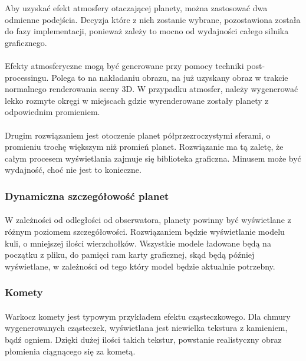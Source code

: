 Aby uzyskać efekt atmosfery otaczającej planety, można zastosować dwa odmienne podejścia. Decyzja które z nich zostanie wybrane, pozostawiona została do fazy implementacji, ponieważ zależy to mocno od wydajności całego silnika graficznego.

\paragraph{}

Efekty atmosferyczne mogą być generowane przy pomocy techniki post-processingu. Polega to na nakładaniu obrazu, na już uzyskany obraz w trakcie normalnego renderowania sceny 3D. W przypadku atmosfer, należy wygenerować lekko rozmyte okręgi w miejscach gdzie wyrenderowane zostały planety z odpowiednim promieniem.

\paragraph{}

Drugim rozwiązaniem jest otoczenie planet półprzezroczystymi sferami, o promieniu trochę większym niż promień planet. Rozwiązanie ma tą zaletę, że całym procesem wyświetlania zajmuje się biblioteka graficzna. Minusem może być wydajność, choć nie jest to konieczne.


\subsubsection{Dynamiczna szczegółowość planet}\label{subsub:dynamiczna szczegolowosc planet}

\paragraph{}

W zależności od odległości od obserwatora, planety powinny być wyświetlane z różnym poziomem szczegółowości. Rozwiązaniem będzie wyświetlanie modelu kuli, o mniejszej ilości wierzchołków. Wszystkie modele ładowane będą na początku z pliku, do pamięci ram karty graficznej, skąd będą później wyświetlane, w zależności od tego który model będzie aktualnie potrzebny.

\subsubsection{Komety}\label{subsub:komety}

\paragraph{}

Warkocz komety jest typowym przykładem efektu cząsteczkowego. Dla chmury wygenerowanych cząsteczek, wyświetlana jest niewielka tekstura z kamieniem, bądź ogniem. Dzięki dużej ilości takich tekstur, powstanie realistyczny obraz płomienia ciągnącego się za kometą.

